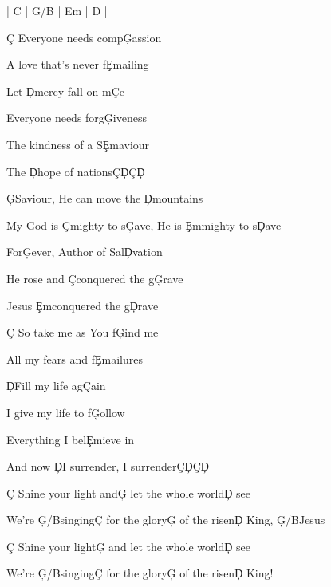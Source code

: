 \documentclass[9pt]{extarticle}
\begin{document}
\bsong

\bi
| C |  G/B  | Em | D |
\ei

\bv
\c{C} Everyone needs comp\c{G}assion

A love that's never f\c{Em}ailing

Let \c{D}mercy fall on m\c{C}e

Everyone needs forg\c{G}iveness

The kindness of a S\c{Em}aviour

The \c{D}hope of nations\c{C}\c{D}\c{C}\c{D}
\ev

\bc
\c{G}Saviour, He can move the \c{D}mountains

My God is \c{C}mighty to s\c{G}ave, He is \c{Em}mighty to s\c{D}ave

For\c{G}ever, Author of Sal\c{D}vation

He rose and \c{C}conquered the g\c{G}rave

Jesus \c{Em}conquered the g\c{D}rave
\ec

\bv
\c{C} So take me as You f\c{G}ind me

All my fears and f\c{Em}ailures

\c{D}Fill my life ag\c{C}ain

I give my life to f\c{G}ollow

Everything I bel\c{Em}ieve in

And now \c{D}I surrender, I surrender\c{C}\c{D}\c{C}\c{D}
\ev


\bb[2]
\c{C} Shine your light and\c{G} let the whole world\c{D} see

We're \c{G/B}singing\c{C} for the glory\c{G} of the risen\c{D} King, \c{G/B}Jesus

\c{C} Shine your light\c{G} and let the whole world\c{D} see

We're \c{G/B}singing\c{C} for the glory\c{G} of the risen\c{D} King!
\eb



\esong
\end{document}
